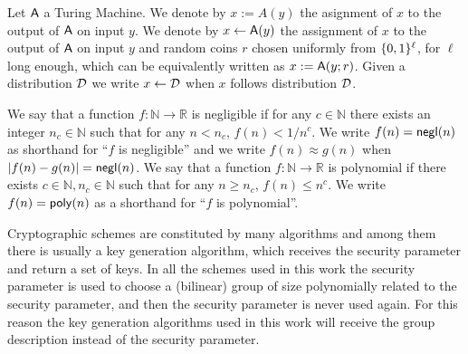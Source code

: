 Let $\mathsf{A}$ a Turing Machine. We denote by $x:=A(y)$ the asignment of $x$ to the output of $\mathsf{A}$ on input $y$. We denote by $x\gets\mathsf{A}(y)$ the assignment of $x$ to the output of $\mathsf{A}$ on input $y$ and random coins $r$ chosen uniformly from $\{0,1\}^\ell$, for $\ell$ long enough, which can be equivalently written as $x:=\mathsf{A}(y;r)$. Given a distribution $\mathcal{D}$ we write $x\gets\mathcal{D}$ when $x$ follows distribution $\mathcal{D}$. 

We say that a function $f:\mathbb{N}\to\mathbb{R}$ is negligible if for any $c\in\mathbb{N}$ there exists an integer $n_c\in\mathbb{N}$ such that for any $n< n_c$, $f(n)<1/n^c$. We write $f(n)=\mathsf{negl}(n)$ as shorthand for ``$f$ is negligible'' and we write $f(n)\approx g(n)$ when $|f(n)-g(n)|=\mathsf{negl}(n)$. We say that a function $f:\mathbb{N}\to\mathbb{R}$ is polynomial if there exists $c\in\mathbb{N},n_c\in\mathbb{N}$ such that for any $n\geq n_c$, $f(n)\leq n^c$. We write $f(n)=\mathsf{poly}(n)$ as a shorthand for ``$f$ is polynomial''.

Cryptographic schemes are constituted by many algorithms and among them there is usually a key generation algorithm, which receives the security parameter and return a set of keys. In all the schemes used in this work the security parameter is used to choose a (bilinear) group of size polynomially related to the security parameter, and then the security parameter is never used again. For this reason the key generation algorithms used in this work will receive the group description instead of the security parameter.
